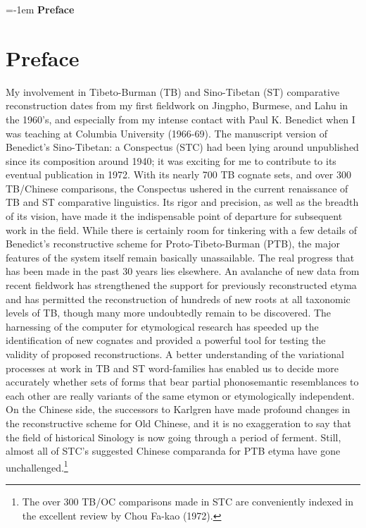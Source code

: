 {\large \parindent=-1em \textbf{Preface}}
\vspace{0.25em}

\section{Preface}

My involvement in Tibeto-Burman (TB) and Sino-Tibetan (ST) comparative reconstruction dates from my first fieldwork on Jingpho, Burmese, and Lahu in the 1960's, and especially from my intense contact with Paul K. Benedict when I was teaching at Columbia University (1966-69). The manuscript version of Benedict's Sino-Tibetan: a Conspectus (STC) had been lying around unpublished since its composition around 1940; it was exciting for me to contribute to its eventual publication in 1972. With its nearly 700 TB cognate sets, and over 300 TB/Chinese comparisons, the Conspectus ushered in the current renaissance of TB and ST comparative linguistics. Its rigor and precision, as well as the breadth of its vision, have made it the indispensable point of departure for subsequent work in the field. While there is certainly room for tinkering with a few details of Benedict's reconstructive scheme for Proto-Tibeto-Burman (PTB), the major features of the system itself remain basically unassailable. The real progress that has been made in the past 30 years lies elsewhere. An avalanche of new data from recent fieldwork has strengthened the support for previously reconstructed etyma and has permitted the reconstruction of hundreds of new roots at all taxonomic levels of TB, though many more undoubtedly remain to be discovered. The harnessing of the computer for etymological research has speeded up the identification of new cognates and provided a powerful tool for testing the validity of proposed reconstructions. A better understanding of the variational processes at work in TB and ST word-families has enabled us to decide more accurately whether sets of forms that bear partial phonosemantic resemblances to each other are really variants of the same etymon or etymologically independent. On the Chinese side, the successors to Karlgren have made profound changes in the reconstructive scheme for Old Chinese, and it is no exaggeration to say that the field of historical Sinology is now going through a period of ferment. Still, almost all of STC's suggested Chinese comparanda for PTB etyma have gone unchallenged.\footnote{The over 300 TB/OC comparisons made in STC are conveniently indexed in the excellent review by Chou Fa-kao (1972).}

